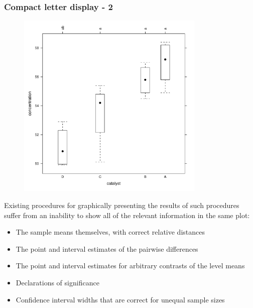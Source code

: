 \documentclass{beamer}
\begin{document}
\begin{frame}
\frametitle{Compact letter display - 2}
\begin{figure}
	\centering
		\includegraphics[width=0.80\textwidth]{Boxplot_catalystBretz.pdf}
	\label{fig:cld2_catalyst}
\end{figure}
\end{frame}

\begin{frame}
Existing procedures for graphically presenting the results of such procedures suffer from
an inability to show all of the relevant information in the same plot:
\begin{itemize}
\item The sample means themselves, with correct relative distances 
\item The point and interval estimates of the pairwise differences
\item The point and interval estimates for arbitrary contrasts of the level means
\item Declarations of significance
\item Confidence interval widths that are correct for unequal sample sizes
\end{itemize}
\end{frame}
\end{document}
